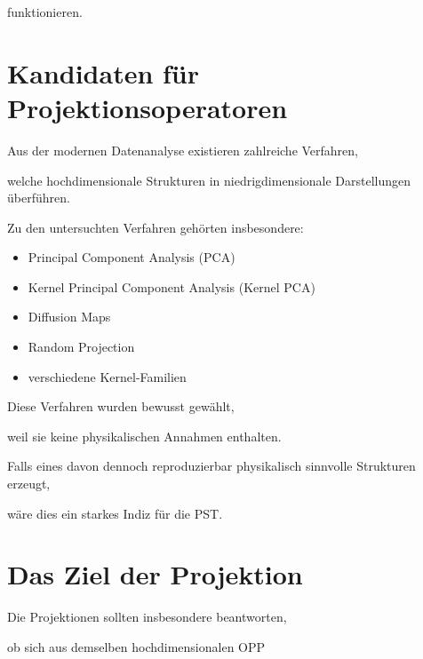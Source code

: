 funktionieren.


\section*{Kandidaten für Projektionsoperatoren}

Aus der modernen Datenanalyse existieren zahlreiche Verfahren,

welche hochdimensionale Strukturen in niedrigdimensionale Darstellungen überführen.

Zu den untersuchten Verfahren gehörten insbesondere:

\begin{itemize}

\item

Principal Component Analysis (PCA)

\item

Kernel Principal Component Analysis (Kernel PCA)

\item

Diffusion Maps

\item

Random Projection

\item

verschiedene Kernel-Familien

\end{itemize}

Diese Verfahren wurden bewusst gewählt,

weil sie keine physikalischen Annahmen enthalten.

Falls eines davon dennoch reproduzierbar physikalisch sinnvolle Strukturen erzeugt,

wäre dies ein starkes Indiz für die PST.


\section*{Das Ziel der Projektion}

Die Projektionen sollten insbesondere beantworten,

ob sich aus demselben hochdimensionalen OPP

